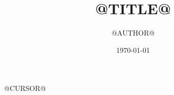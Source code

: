 \documentclass[a4paper, oneside, 10pt]{book}
\author{@AUTHOR@}
\title{@TITLE@}
\date{\today}
\begin{document}
\maketitle
@CURSOR@
\end{document}
